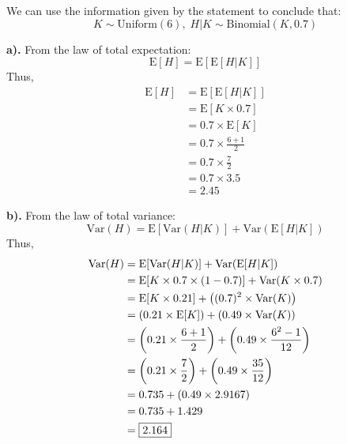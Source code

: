 \documentclass[a4paper, 10pt]{article}
\begin{document}
\begin{solution}
	We can use the information given by the statement to conclude that:
	\[
		K \sim \text{Uniform}(6), \; H | K \sim \text{Binomial}(K, 0.7)
	\]
	\par\noindent\textbf{a).} From the law of total expectation:
	\[
		\text{E}[H] = \text{E}[\text{E}[H | K]]
	\]
	Thus,
	\begin{align*}
		\text{E}[H] & = \text{E}[\text{E}[H | K]]  \\
		            & = \text{E}[K \times 0.7]     \\
		            & = 0.7 \times \text{E}[K]     \\
		            & = 0.7 \times \frac{6 + 1}{2} \\
		            & = 0.7 \times \frac{7}{2}     \\
		            & = 0.7 \times 3.5             \\
		            & = \boxed{2.45}
	\end{align*}

	\par\noindent\textbf{b).} From the law of total variance:
	\[
		\text{Var}(H) = \text{E}[\text{Var}(H | K)] + \text{Var}(\text{E}[H | K])
	\]
	Thus,
	\begin{align*}
		\text{Var}(H) & = \text{E}[\text{Var}(H | K)] + \text{Var}(\text{E}[H | K])                    \\
		              & = \text{E}[K \times 0.7 \times (1 - 0.7)] + \text{Var}(K \times 0.7)           \\
		              & = \text{E}[K \times 0.21] + \left((0.7)^2 \times \text{Var}(K)\right)               \\
		              & = \left(0.21 \times \text{E}[K]\right) + \left(0.49 \times \text{Var}(K)\right)          \\
		              & = \left(0.21 \times \frac{6 + 1}{2}\right) + \left(0.49 \times \frac{6^2 - 1}{12}\right) \\
		              & = \left(0.21 \times \frac{7}{2}\right) + \left(0.49 \times \frac{35}{12}\right)          \\
		              & = 0.735 + \left(0.49 \times 2.9167\right)                                           \\
		              & = 0.735 + 1.429                                                                \\
		              & = \boxed{2.164}
	\end{align*}
\end{solution}
\end{document}
